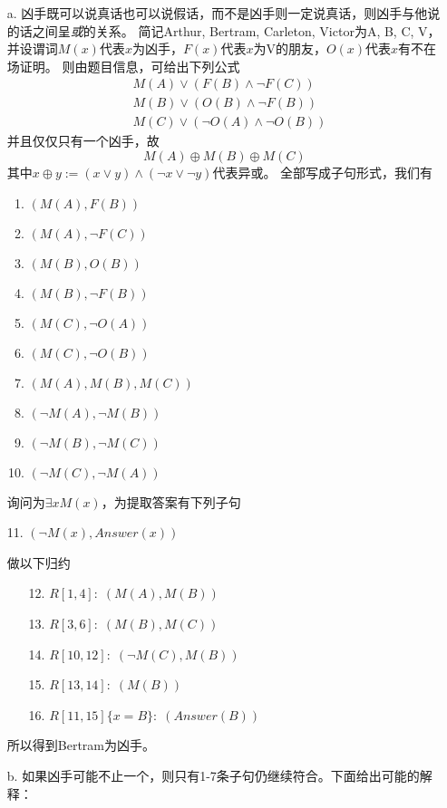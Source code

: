 \documentclass[a4paper, 11pt]{article}
\begin{document}
\begin{answer}
\begin{itemize}
    \item [a.] 凶手既可以说真话也可以说假话，而不是凶手则一定说真话，则凶手与他说的话之间呈\emph{或}的关系。
    简记Arthur, Bertram, Carleton, Victor为A, B, C, V，并设谓词$M(x)$代表$x$为凶手，$F(x)$代表$x$为V的朋友，$O(x)$代表$x$有不在场证明。
    则由题目信息，可给出下列公式
    \[\begin{aligned}
        & M(A)\lor(F(B)\land\lnot F(C))\\
        & M(B)\lor(O(B)\land\lnot F(B))\\
        & M(C)\lor(\lnot O(A)\land\lnot O(B))
    \end{aligned}\]
    并且仅仅只有一个凶手，故
    \[M(A)\oplus M(B)\oplus M(C)\]
    其中$x \oplus y:=(x\lor y)\land(\lnot x\lor\lnot y)$代表异或。
    全部写成子句形式，我们有
    \begin{enumerate}
        \item $(M(A),F(B))$
        \item $(M(A),\lnot F(C))$
        \item $(M(B),O(B))$
        \item $(M(B),\lnot F(B))$
        \item $(M(C),\lnot O(A))$
        \item $(M(C),\lnot O(B))$
        \item $(M(A), M(B), M(C))$
        \item $(\lnot M(A), \lnot M(B))$
        \item $(\lnot M(B), \lnot M(C))$
        \item $(\lnot M(C), \lnot M(A))$
    \end{enumerate}
    询问为$\exists xM(x)$，为提取答案有下列子句
    \begin{flushleft}
        11. $(\lnot M(x),Answer(x))$
    \end{flushleft}
    做以下归约
    \begin{enumerate}
        \item[12.] $R[1,4]:\;(M(A),M(B))$
        \item[13.] $R[3,6]:\;(M(B),M(C))$
        \item[14.] $R[10,12]:\;(\lnot M(C),M(B))$
        \item[15.] $R[13,14]:\;(M(B))$
        \item[16.] $R[11,15]\{x=B\}:\;(Answer(B))$
    \end{enumerate}
    所以得到Bertram为凶手。
    \item [b.] 如果凶手可能不止一个，则只有1-7条子句仍继续符合。下面给出可能的解释：

\end{itemize}
\end{answer}
\end{document}
